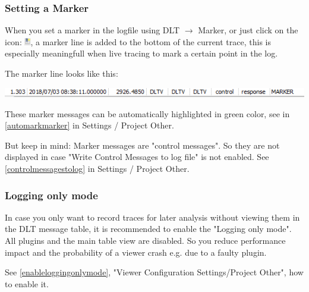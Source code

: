 \documentclass[a4paper,11pt]{article}
\newcommand{\caution}[1]{\begin{ibox} \textbf{CAUTION:} \emph{#1} \end{ibox}}
\begin{document}
\subsubsection{Setting a Marker}

\label{settingmarker}
When you set a marker in the logfile using DLT \ensuremath{\rightarrow} Marker, or just click on the icon: \includegraphics[width=0.02\textwidth]{images/marker_icon.png},
a marker line is added to the bottom of the current trace, this is especially meaningfull when live tracing
to mark a certain point in the log.\linebreak

The marker line looks like this:\linebreak

\includegraphics[width=1.0\textwidth]{images/markermessage.png}

These marker messages can be automatically highlighted in green color, see in \autoref{automarkmarker} in Settings / Project Other.

But keep in mind: Marker messages are "control messages". So they are not displayed in case "Write Control Messages to log file" is not enabled.
See \autoref{controlmessagestolog} in Settings / Project Other.


\subsubsection{Logging only mode}
\label{Loggingonlymode}
In case you only want to record traces for later analysis without viewing them in the DLT message table,
it is recommended to enable the "Logging only mode". All plugins and the main table view are disabled.
So you reduce performance impact and the probability of a viewer crash e.g. due to a faulty plugin.

See \autoref{enableloggingonlymode}, "Viewer Configuration Settings/Project Other", how to enable it.
\end{document}
